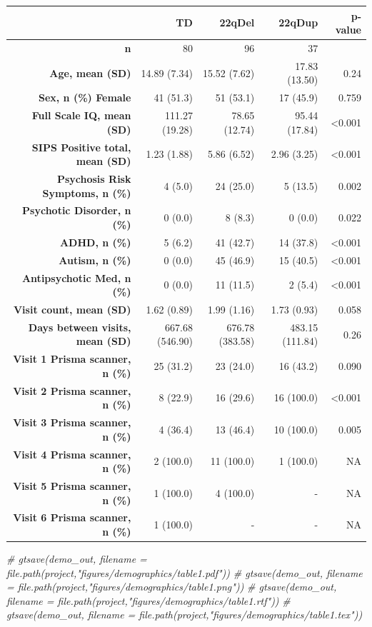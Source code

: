 \documentclass[
]{article}
\newenvironment{Shaded}{\begin{snugshade}}{\end{snugshade}}
\newcommand{\CommentTok}[1]{\textcolor[rgb]{0.56,0.35,0.01}{\textit{#1}}}
\begin{document}
\begin{longtable}{rrrrr}
\toprule
  & TD & 22qDel & 22qDup & p-value \\ 
\midrule\addlinespace[2.5pt]
\textbf{n} & 80 & 96 & 37 &  \\ 
\textbf{Age, mean (SD)} & 14.89 (7.34) & 15.52 (7.62) & 17.83 (13.50) & 0.24 \\ 
\textbf{Sex, n (\%) Female} & 41 (51.3)  & 51 (53.1)  & 17 (45.9)  & 0.759 \\ 
\textbf{Full Scale IQ, mean (SD)} & 111.27 (19.28) & 78.65 (12.74) & 95.44 (17.84) & <0.001 \\ 
\textbf{SIPS Positive total, mean (SD)} & 1.23 (1.88) & 5.86 (6.52) & 2.96 (3.25) & <0.001 \\ 
\textbf{Psychosis Risk Symptoms, n (\%)} & 4 (5.0)  & 24 (25.0)  & 5 (13.5)  & 0.002 \\ 
\textbf{Psychotic Disorder, n (\%)} & 0 (0.0)  & 8 (8.3)  & 0 (0.0)  & 0.022 \\ 
\textbf{ADHD, n (\%)} & 5 (6.2)  & 41 (42.7)  & 14 (37.8)  & <0.001 \\ 
\textbf{Autism, n (\%)} & 0 (0.0)  & 45 (46.9)  & 15 (40.5)  & <0.001 \\ 
\textbf{Antipsychotic Med, n (\%)} & 0 (0.0)  & 11 (11.5)  & 2 (5.4)  & <0.001 \\ 
\textbf{Visit count, mean (SD)} & 1.62 (0.89) & 1.99 (1.16) & 1.73 (0.93) & 0.058 \\ 
\textbf{Days between visits, mean (SD)} & 667.68 (546.90) & 676.78 (383.58) & 483.15 (111.84) & 0.26 \\ 
\textbf{Visit 1 Prisma scanner, n (\%)} & 25 (31.2)  & 23 (24.0)  & 16 (43.2)  &  0.090 \\ 
\textbf{Visit 2 Prisma scanner, n (\%)} &  8 (22.9)  & 16 (29.6)  & 16 (100.0)  & <0.001 \\ 
\textbf{Visit 3 Prisma scanner, n (\%)} &  4 (36.4)  & 13 (46.4)  & 10 (100.0)  &  0.005 \\ 
\textbf{Visit 4 Prisma scanner, n (\%)} & 2 (100.0)  & 11 (100.0)  & 1 (100.0)  &  NA \\ 
\textbf{Visit 5 Prisma scanner, n (\%)} & 1 (100.0)  & 4 (100.0)  & - &  NA \\ 
\textbf{Visit 6 Prisma scanner, n (\%)} & 1 (100.0)  & - & - &  NA \\ 
\bottomrule
\end{longtable}

\begin{Shaded}
\begin{Highlighting}[]
\CommentTok{\# gtsave(demo\_out, filename = file.path(project,"figures/demographics/table1.pdf"))}
\CommentTok{\# gtsave(demo\_out, filename = file.path(project,"figures/demographics/table1.png"))}
\CommentTok{\# gtsave(demo\_out, filename = file.path(project,"figures/demographics/table1.rtf"))}
\CommentTok{\# gtsave(demo\_out, filename = file.path(project,"figures/demographics/table1.tex"))}
\end{Highlighting}
\end{Shaded}
\end{document}
